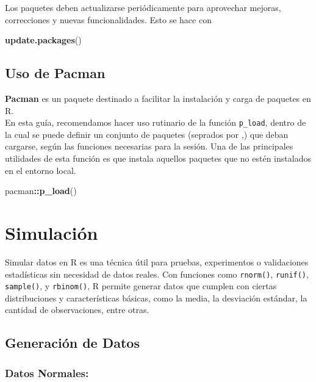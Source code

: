 \documentclass[
]{book}
\newenvironment{Shaded}{\begin{snugshade}}{\end{snugshade}}
\newcommand{\FunctionTok}[1]{\textcolor[rgb]{0.13,0.29,0.53}{\textbf{#1}}}
\newcommand{\NormalTok}[1]{#1}
\newcommand{\SpecialCharTok}[1]{\textcolor[rgb]{0.81,0.36,0.00}{\textbf{#1}}}
\begin{document}
Los paquetes deben actualizarse periódicamente para aprovechar mejoras, correcciones y nuevas funcionalidades. Esto se hace con

\begin{Shaded}
\begin{Highlighting}[]
\FunctionTok{update.packages}\NormalTok{()}
\end{Highlighting}
\end{Shaded}

\section{Uso de Pacman}\label{uso-de-pacman}

\textbf{Pacman} es un paquete destinado a facilitar la instalación y carga de paquetes en R.\\
En esta guía, recomendamos hacer uso rutinario de la función \texttt{p\_load}, dentro de la cual se puede definir un conjunto de paquetes (seprados por ,) que deban cargarse, según las funciones necesarias para la sesión. Una de las principales utilidades de esta función es que instala aquellos paquetes que no estén instalados en el entorno local.

\begin{Shaded}
\begin{Highlighting}[]
\NormalTok{pacman}\SpecialCharTok{::}\FunctionTok{p\_load}\NormalTok{()}
\end{Highlighting}
\end{Shaded}

\chapter{Simulación}\label{simulaciuxf3n}

Simular datos en R es una técnica útil para pruebas, experimentos o validaciones estadísticas sin necesidad de datos reales. Con funciones como \texttt{rnorm()}, \texttt{runif()}, \texttt{sample()}, y \texttt{rbinom()}, R permite generar datos que cumplen con ciertas distribuciones y características básicas, como la media, la desviación estándar, la cantidad de observaciones, entre otras.

\section{Generación de Datos}\label{generaciuxf3n-de-datos}

\subsection{Datos Normales:}\label{datos-normales}
\end{document}
